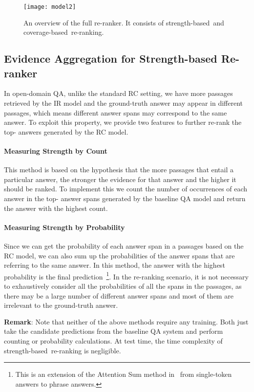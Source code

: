 \documentclass{article} \usepackage{iclr2018_conference,times}
\def \coherence {strength-based}
\def \union {coverage-based}
\begin{document}
\begin{figure}[t]
\centering
\texttt{[image: model2]}
\label{fig:model}
\vspace{-0.2in}
\caption{An overview of the full re-ranker. It consists of \coherence\ and \union\ re-ranking.}
\end{figure}

\subsection{Evidence Aggregation for Strength-based Re-ranker}
\label{sec:method_coherence}

In open-domain QA, unlike the standard RC setting, we have more passages retrieved by the IR model and the ground-truth answer may appear in different passages, which means different answer spans may correspond to the same answer. To exploit this property, we provide two features to further re-rank the top- answers generated by the RC model.

\paragraph{Measuring Strength by Count}
This method is based on the hypothesis that the more passages that entail a particular answer, the stronger the evidence for that answer and the higher it should be ranked.  To implement this we count the number of occurrences of each answer in the top- answer spans generated by the baseline QA model and return the answer with the highest count.

\paragraph{Measuring Strength by Probability} Since we can get the probability of each answer span in a passages based on the RC model, we can also sum up the probabilities of the answer spans that are referring to the same answer. In this method, the answer with the highest probability is the final prediction~\footnote{This is an extension of the Attention Sum method in~\citep{kadlec2016text} from single-token answers to phrase answers.}. In the re-ranking scenario, it is not necessary to exhaustively consider all the probabilities of all the spans in the passages, as there may be a large number of different answer spans and most of them are irrelevant to the ground-truth answer.

\noindent\textbf{Remark}: Note that neither of the above methods require any training. Both just take the candidate predictions from the baseline QA system and  perform counting or probability calculations. At test time, the time complexity of \coherence\ re-ranking is negligible. 
\end{document}
